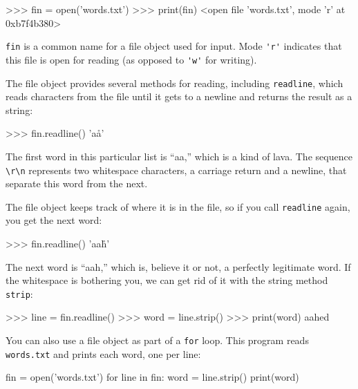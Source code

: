 
\beforeverb
\begin{pyinterpreter}
>>> fin = open('words.txt')
>>> print(fin)
<open file 'words.txt', mode 'r' at 0xb7f4b380>
\end{pyinterpreter}
\afterverb
%
{\tt fin} is a common name for a file object used for
input.  Mode \verb"'r'" indicates that this file is open for
reading (as opposed to \verb"'w'" for writing).


The file object provides several methods for reading, including
{\tt readline}, which reads characters from the file
until it gets to a newline and returns the result as a
string:

\beforeverb
\begin{pyinterpreter}
>>> fin.readline()
'aa\r\n'
\end{pyinterpreter}
\afterverb
%
The first word in this particular list is ``aa,'' which is a kind of
lava.  The sequence \verb"\r\n" represents two whitespace characters,
a carriage return and a newline, that separate this word from the
next.

The file object keeps track of where it is in the file, so
if you call {\tt readline} again, you get the next word:

\beforeverb
\begin{pyinterpreter}
>>> fin.readline()
'aah\r\n'
\end{pyinterpreter}
\afterverb
%
The next word is ``aah,'' which is, believe it or not, a perfectly legitimate
word. If the whitespace is bothering you,
we can get rid of it with the string method {\tt strip}:


\beforeverb
\begin{pyinterpreter}
>>> line = fin.readline()
>>> word = line.strip()
>>> print(word)
aahed
\end{pyinterpreter}
\afterverb
%
You can also use a file object as part of a {\tt for} loop.
This program reads {\tt words.txt} and prints each word, one
per line:


\beforeverb
\begin{pycode}
fin = open('words.txt')
for line in fin:
    word = line.strip()
    print(word)
\end{pycode}
\afterverb
%

